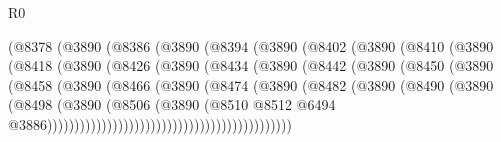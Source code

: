 \begin{lexlean}{R0}
\begin{coremodule}
                        (@8378
                          (@3890
                            (@8386
                              (@3890
                                (@8394
                                  (@3890
                                    (@8402
                                      (@3890
                                        (@8410
                                          (@3890
                                            (@8418
                                              (@3890
                                                (@8426
                                                  (@3890
                                                    (@8434
                                                      (@3890
                                                        (@8442
                                                          (@3890
                                                            (@8450
                                                              (@3890
                                                                (@8458
                                                                  (@3890
                                                                    (@8466
                                                                      (@3890
                                                                        (@8474
                                                                          (@3890
                                                                            (@8482
                                                                              (@3890
                                                                                (@8490
                                                                                  (@3890
                                                                                    (@8498
                                                                                      (@3890
                                                                                        (@8506
                                                                                          (@3890
                                                                                            (@8510
                                                                                              @8512
                                                                                              @6494
                                                                                              @3886)))))))))))))))))))))))))))))))))))))))))))))

\end{coremodule}
\end{lexlean}
